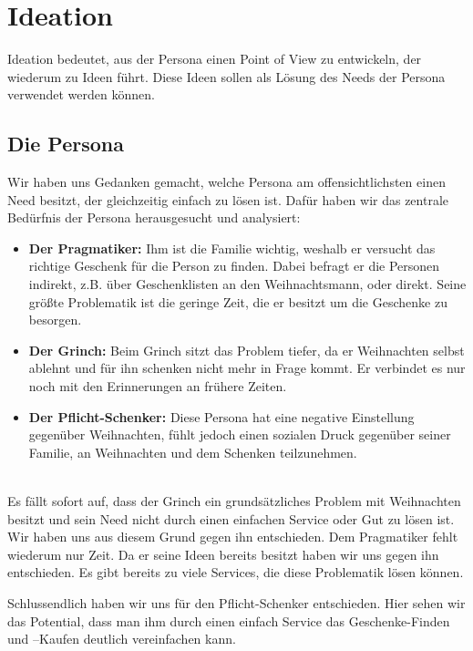 \documentclass[12pt,ngerman, fleqn]{book} %
\begin{document}
\chapter{Ideation}
Ideation bedeutet, aus der Persona einen Point of View zu entwickeln, der wiederum zu Ideen führt. Diese Ideen sollen als Lösung des Needs der Persona verwendet werden können. 

\section{Die Persona}
Wir haben uns Gedanken gemacht, welche Persona am offensichtlichsten einen Need besitzt, der gleichzeitig einfach zu lösen ist. Dafür haben wir das zentrale Bedürfnis der Persona herausgesucht und analysiert:

\begin{itemize}
    \item \textbf{Der Pragmatiker:} Ihm ist die Familie wichtig, weshalb er versucht das richtige Geschenk für die Person zu finden. Dabei befragt er die Personen indirekt, z.B. über Geschenklisten an den Weihnachtsmann, oder direkt. Seine größte Problematik ist die geringe Zeit, die er besitzt um die Geschenke zu besorgen.
    \item \textbf{Der Grinch:} Beim Grinch sitzt das Problem tiefer, da er Weihnachten selbst ablehnt und für ihn schenken nicht mehr in Frage kommt. Er verbindet es nur noch mit den Erinnerungen an frühere Zeiten.
    \item \textbf{Der Pflicht-Schenker:} Diese Persona hat eine negative Einstellung gegenüber Weihnachten, fühlt jedoch einen sozialen Druck gegenüber seiner Familie, an Weihnachten und dem Schenken teilzunehmen.\\\\
\end{itemize}
Es fällt sofort auf, dass der Grinch ein grundsätzliches Problem mit Weihnachten besitzt und sein Need nicht durch einen einfachen Service oder Gut zu lösen ist. Wir haben uns aus diesem Grund gegen ihn entschieden. Dem Pragmatiker fehlt wiederum nur Zeit. Da er seine Ideen bereits besitzt haben wir uns gegen ihn entschieden. Es gibt bereits zu viele Services, die diese Problematik lösen können.

Schlussendlich haben wir uns für den Pflicht-Schenker entschieden. Hier sehen wir das Potential, dass man ihm durch einen einfach Service das Geschenke-Finden und –Kaufen deutlich vereinfachen kann.
\end{document}
